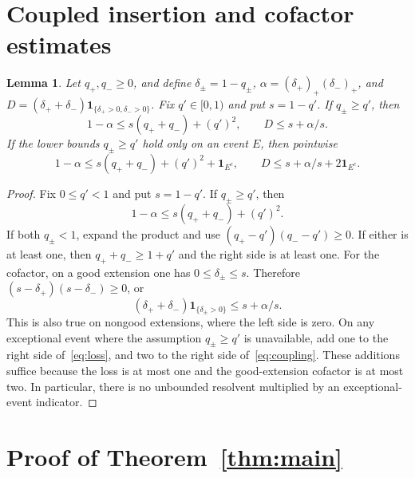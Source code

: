 \documentclass[11pt]{article}
\numberwithin{equation}{section}
\newtheorem{lemma}[theorem]{Lemma}
\theoremstyle{remark}
\begin{document}
\section{Coupled insertion and cofactor estimates}\label{sec:coupling}

\begin{lemma}\label{lem:scalar-coupling}
Let $q_+,q_-\ge0$, and define
$\delta_\pm=1-q_\pm$, $\alpha=(\delta_+)_+(\delta_-)_+$, and
$D=(\delta_++\delta_-)\mathbf1_{\{\delta_+>0,\delta_->0\}}$.
Fix $q'\in[0,1)$ and put $s=1-q'$. If $q_\pm\ge q'$, then
\[
 1-\alpha\le s(q_++q_-)+(q')^2,\qquad
 D\le s+\alpha/s.
\]
If the lower bounds $q_\pm\ge q'$ hold only on an event $E$, then
pointwise
\[
 1-\alpha\le s(q_++q_-)+(q')^2+\mathbf1_{E^c},
 \qquad D\le s+\alpha/s+2\mathbf1_{E^c}.
\]
\end{lemma}
\begin{proof}
Fix $0\le q'<1$ and put $s=1-q'$. If $q_\pm\ge q'$, then
\begin{equation}\label{eq:loss}
 1-\alpha\le s(q_++q_-)+(q')^2.
\end{equation}
If both $q_\pm<1$, expand the product and use
$(q_+-q')(q_--q')\ge0$. If either is at least one, then
$q_++q_-\ge1+q'$ and the right side is at least one.
For the cofactor, on a good extension one has
$0\le\delta_\pm\le s$. Therefore
$(s-\delta_+)(s-\delta_-)\ge0$, or
\begin{equation}\label{eq:coupling}
 (\delta_++\delta_-)\mathbf1_{\{\delta_\pm>0\}}
 \le s+\alpha/s.
\end{equation}
This is also true on nongood extensions, where the left side is zero.
On any exceptional event where the assumption $q_\pm\ge q'$ is
unavailable, add one to the right side of~\eqref{eq:loss}, and two to
the right side of~\eqref{eq:coupling}. These additions suffice because
the loss is at most one and the good-extension cofactor is at most
two. In particular, there is no unbounded resolvent multiplied by an
exceptional-event indicator.
\end{proof}

\section{Proof of Theorem~\ref{thm:main}}\label{sec:induction}
\end{document}

